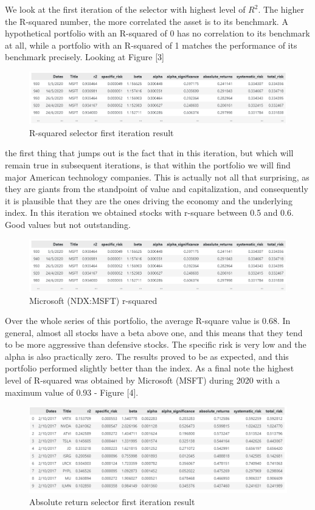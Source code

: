 \documentclass[twocolumn]{article}
\begin{document}
We look at the first iteration of the selector with highest level of \(R^2\). The higher the R-squared number, the more correlated the asset is to its benchmark. A hypothetical portfolio with an R-squared of 0 has no correlation to its benchmark at all, while a portfolio with an R-squared of 1 matches the performance of its benchmark precisely. Looking at Figure [3]
\begin{figure}[t]
\centering\includegraphics[scale=0.6]{microsoft.png}
\caption{R-squared selector first iteration result}
\end{figure}
the first thing that jumps out is the fact that in this iteration, but which will remain true in subsequent iterations, is that within the portfolio we will find major American technology companies. This is actually not all that surprising, as they are giants from the standpoint of value and capitalization, and consequently it is plausible that they are the ones driving the economy and the underlying index. In this iteration we obtained stocks with r-square between 0.5 and 0.6. Good values but not outstanding.
\begin{figure}[b]
\centering\includegraphics[scale=0.5]{microsoft.png}
\caption{Microsoft (NDX:MSFT) r-squared}
\end{figure}
Over the whole series of this portfolio, the average R-square value is 0.68. In general, almost all stocks have a beta above one, and this means that they tend to be more aggressive than defensive stocks. The specific risk is very low and the alpha is also practically zero. The results proved to be as expected, and this portfolio performed slightly better than the index. As a final note the highest level of R-squared was obtained by Microsoft (MSFT) during 2020 with a maximum value of 0.93 - Figure [4].
\begin{figure}[t]
\centering\includegraphics[scale=0.5]{absolute returns.png}
\caption{Absolute return selector first iteration result}
\end{figure}
\end{document}
